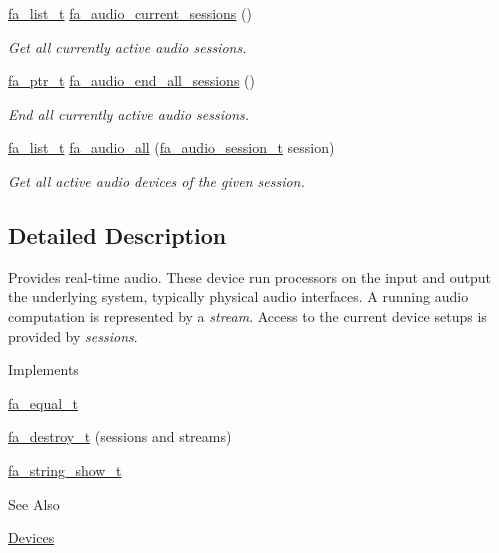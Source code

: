 \begin{DoxyCompactItemize}
\hyperlink{group___fa_list_ga35ecb12ab934ded0cce0bcf28e3bc5d2}{fa\-\_\-list\-\_\-t} \hyperlink{group___fa_audio_session_ga4ca512f9ca05840d737cc947e278dd19}{fa\-\_\-audio\-\_\-current\-\_\-sessions} ()
\begin{DoxyCompactList}\small\item\em Get all currently active audio sessions. \end{DoxyCompactList}\item 
\hyperlink{group___fa_ga915ddeae99ad7568b273d2b876425197}{fa\-\_\-ptr\-\_\-t} \hyperlink{group___fa_audio_session_ga8fe894dde7fe548e4c8e20a79609919d}{fa\-\_\-audio\-\_\-end\-\_\-all\-\_\-sessions} ()
\begin{DoxyCompactList}\small\item\em End all currently active audio sessions. \end{DoxyCompactList}\item 
\hyperlink{group___fa_list_ga35ecb12ab934ded0cce0bcf28e3bc5d2}{fa\-\_\-list\-\_\-t} \hyperlink{group___fa_audio_session_ga6ca6844a8e2e55157571335d5cb7a446}{fa\-\_\-audio\-\_\-all} (\hyperlink{group___fa_audio_session_ga62ee22268c23f1b18447141feccc01e0}{fa\-\_\-audio\-\_\-session\-\_\-t} session)
\begin{DoxyCompactList}\small\item\em Get all active audio devices of the given session. \end{DoxyCompactList}\end{DoxyCompactItemize}


\subsection{Detailed Description}
Provides real-\/time audio. These device run processors on the input and output the underlying system, typically physical audio interfaces. A running audio computation is represented by a {\itshape stream}. Access to the current device setups is provided by {\itshape sessions}.

\begin{DoxyParagraph}{Implements}

\begin{DoxyItemize}
\item \hyperlink{structfa__equal__t}{fa\-\_\-equal\-\_\-t}
\item \hyperlink{structfa__destroy__t}{fa\-\_\-destroy\-\_\-t} (sessions and streams)
\item \hyperlink{structfa__string__show__t}{fa\-\_\-string\-\_\-show\-\_\-t}
\end{DoxyItemize}
\end{DoxyParagraph}
\begin{DoxySeeAlso}{See Also}

\begin{DoxyItemize}
\item \hyperlink{md__devices_Devices}{Devices} 
\end{DoxyItemize}
\end{DoxySeeAlso}


